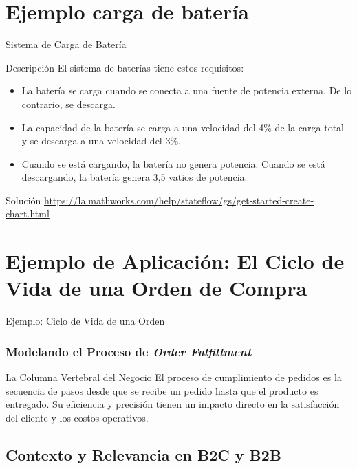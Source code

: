 \documentclass[aspectratio=169,xcolor=dvipsnames]{beamer}
\begin{document}
\section{Ejemplo carga de batería}
\begin{frame}{Sistema de Carga de Batería}
    \begin{block}{Descripción}
       El sistema de baterías tiene estos requisitos:
       \begin{itemize}
           \item La batería se carga cuando se conecta a una fuente de potencia externa. De lo contrario, se descarga.
           \item La capacidad de la batería se carga a una velocidad del 4\% de la carga total y se descarga a una velocidad del 3\%.
           \item Cuando se está cargando, la batería no genera potencia. Cuando se está descargando, la batería genera 3,5 vatios de potencia. 
       \end{itemize}
    \end{block}
    \begin{exampleblock}{Solución}
        \url{https://la.mathworks.com/help/stateflow/gs/get-started-create-chart.html}
    \end{exampleblock}
    \end{frame}

    
\section{Ejemplo de Aplicación: El Ciclo de Vida de una Orden de Compra}

\begin{frame}{Ejemplo: Ciclo de Vida de una Orden}
    \frametitle{Modelando el Proceso de \textit{Order Fulfillment}}
    \begin{block}{La Columna Vertebral del Negocio}
    El proceso de cumplimiento de pedidos es la secuencia de pasos desde que se recibe un pedido hasta que el producto es entregado. Su eficiencia y precisión tienen un impacto directo en la satisfacción del cliente y los costos operativos.
    \end{block}
\end{frame}

\subsection{Contexto y Relevancia en B2C y B2B}
\end{document}
